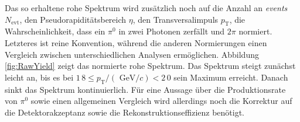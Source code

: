 \newline
Das so erhaltene rohe Spektrum wird zusätzlich noch auf die Anzahl an \textit{events} $N_\text{evt}$, den Pseudorapiditätsbereich $\eta$, den Transversalimpuls $p_\text{T}$, die Wahrscheinlichkeit, dass ein $\pi^{0}$ in zwei Photonen zerfällt und $2\pi$ normiert.
Letzteres ist reine Konvention, während die anderen Normierungen einen Vergleich zwischen unterschiedlichen Analysen ermöglichen.
Abbildung \ref{fig:RawYield} zeigt das normierte rohe Spektrum.
Das Spektrum steigt zunächst leicht an, bis es bei $1\,8 \leq p_{\text{T}}/(\text{ GeV}/c) < 2\,0$ sein Maximum erreicht.
Danach sinkt das Spektrum kontinuierlich.
\newline
Für eine Aussage über die Produktionsrate von $\pi^{0}$ sowie einen allgemeinen Vergleich wird allerdings noch die Korrektur auf die Detektorakzeptanz sowie die Rekonstruktionseffizienz benötigt.